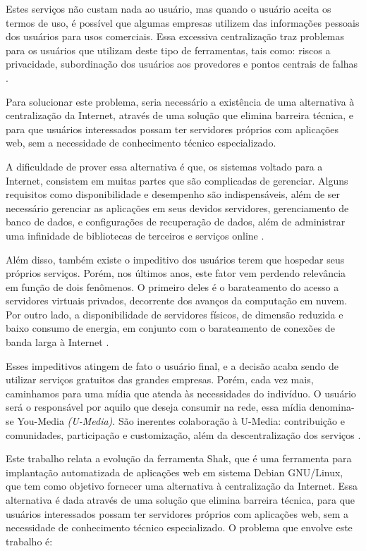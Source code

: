 Estes serviços não custam nada ao usuário, mas quando o usuário aceita os
termos de uso, é possível que algumas empresas utilizem das informações pessoais dos
usuários para usos comerciais. Essa excessiva centralização traz problemas para os usuários que utilizam deste tipo de ferramentas, tais como: riscos a privacidade, subordinação dos usuários
aos provedores e pontos centrais de falhas \cite{shak2015}. 

Para solucionar este problema, seria necessário a existência de uma alternativa à 
centralização da Internet, através de uma solução que elimina barreira técnica, e 
para que usuários interessados possam ter servidores próprios com aplicações web, 
sem a necessidade de conhecimento técnico especializado.

A dificuldade de prover essa alternativa é que, os sistemas voltado para a
Internet, consistem em muitas partes que são complicadas de gerenciar. Alguns
requisitos como disponibilidade e desempenho são indispensáveis, além de ser
necessário gerenciar as aplicações em seus devidos servidores, gerenciamento de
banco de dados, e configurações de recuperação de dados, além de administrar uma
infinidade de bibliotecas de terceiros e serviços online \cite{6265084}.

Além disso, também existe o impeditivo dos usuários terem que hospedar seus próprios serviços. Porém, nos últimos anos, este fator vem perdendo relevância em função de
dois fenômenos. O primeiro deles é o barateamento do acesso a servidores virtuais
privados, decorrente dos avanços da computação em nuvem. Por outro lado, a
disponibilidade de servidores físicos, de dimensão reduzida e baixo consumo de
energia, em conjunto com o barateamento de conexões de banda larga à Internet \cite{shak2015}.

Esses impeditivos atingem de fato o usuário final, e a decisão
acaba sendo de utilizar serviços gratuitos das grandes empresas. Porém, 
cada vez mais, caminhamos para uma mídia que atenda às necessidades do indivíduo. 
O usuário será o responsável por aquilo que deseja consumir na rede, essa mídia 
denomina-se You-Media \textit{(U-Media)}. São inerentes colaboração à U-Media: contribuição 
e comunidades, participação e customização, além da descentralização dos 
serviços \cite{terra2006comunicaccao}. 

Este trabalho relata a evolução da ferramenta Shak, que é uma ferramenta para implantação
automatizada de aplicações web em sistema Debian GNU/Linux, que tem como objetivo fornecer
uma alternativa à centralização da Internet. Essa alternativa é dada através de 
uma solução que elimina barreira técnica, para que usuários interessados possam 
ter servidores próprios com aplicações web, sem a necessidade de conhecimento técnico 
especializado. O problema que envolve este trabalho é:

